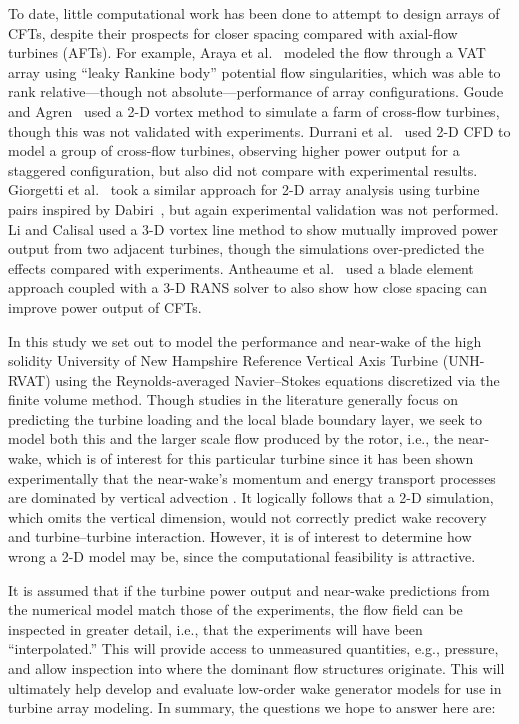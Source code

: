 To date, little computational work has been done to attempt to design arrays of
CFTs, despite their prospects for closer spacing compared with axial-flow
turbines (AFTs). For example, Araya et al.~\cite{Araya2014} modeled the flow
through a VAT array using ``leaky Rankine body'' potential flow singularities,
which was able to rank relative---though not absolute---performance of array
configurations. Goude and Agren~\cite{Goude2010} used a 2-D vortex method to
simulate a farm of cross-flow turbines, though this was not validated with
experiments. Durrani et al.~\cite{Durrani2011} used 2-D CFD to model a
group of cross-flow turbines, observing higher power output for a staggered
configuration, but also did not compare with experimental results. Giorgetti
et al.~\cite{Giorgetti2015} took a similar approach for 2-D array analysis using
turbine pairs inspired by Dabiri~\cite{Dabiri2011}, but again experimental
validation was not performed. Li and Calisal \cite{Li2010} used a 3-D vortex
line method to show mutually improved power output from two adjacent turbines,
though the simulations over-predicted the effects compared with experiments.
Antheaume et al.~\cite{Antheaume2008} used a blade element approach
coupled with a 3-D RANS solver to also show how close spacing can improve power
output of CFTs.

In this study we set out to model the performance and near-wake of the high
solidity University of New Hampshire Reference Vertical Axis Turbine (UNH-RVAT)
using the Reynolds-averaged Navier--Stokes equations discretized via the finite
volume method. Though studies in the literature generally focus on predicting
the turbine loading and the local blade boundary layer, we seek to model both
this and the larger scale flow produced by the rotor, i.e., the near-wake, which
is of interest for this particular turbine since it has been shown
experimentally that the near-wake's momentum and energy transport processes are
dominated by vertical advection \cite{Bachant2015-JoT}. It logically follows
that a 2-D simulation, which omits the vertical dimension, would not correctly
predict wake recovery and turbine--turbine interaction. However, it is of
interest to determine how wrong a 2-D model may be, since the computational
feasibility is attractive.

It is assumed that if the turbine power output and near-wake predictions from
the numerical model match those of the experiments, the flow field can be
inspected in greater detail, i.e., that the experiments will have been
``interpolated.'' This will provide access to unmeasured quantities, e.g.,
pressure, and allow inspection into where the dominant flow structures
originate. This will ultimately help develop and evaluate low-order wake
generator models for use in turbine array modeling. In summary, the questions we
hope to answer here are:

